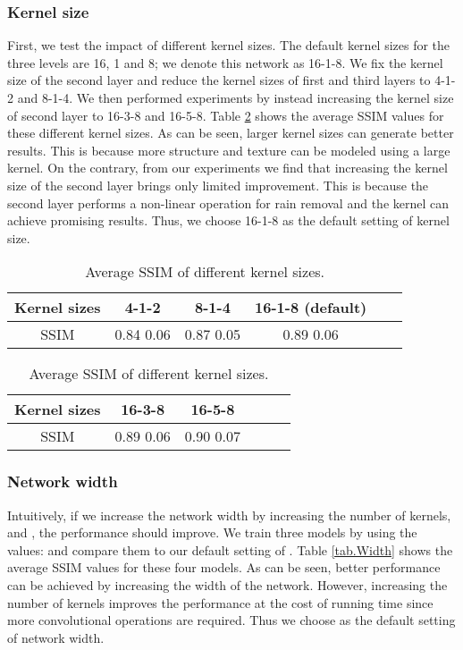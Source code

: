 \documentclass[journal]{IEEEtran}
\begin{document}
\subsubsection{Kernel size}
First, we test the impact of different kernel sizes. The default kernel sizes for the three levels are 16, 1 and 8; we denote this network as 16-1-8. We fix the kernel size of the second layer and reduce the kernel sizes of first and third layers to 4-1-2 and 8-1-4. We then performed experiments by instead increasing the kernel size of second layer to 16-3-8 and 16-5-8. Table \ref{tab.Kernel_size} shows the average SSIM values for these different kernel sizes. As can be seen, larger kernel sizes can generate better results. This is because more structure and texture can be modeled using a large kernel. On the contrary, from our experiments we find that increasing the kernel size of the second layer brings only limited improvement. This is because the second layer performs a non-linear operation for rain removal and the  kernel can achieve promising results. Thus, we choose 16-1-8 as the default setting of kernel size.

\begin{table}[!h]
\caption{Average SSIM of different kernel sizes.}
\label{tab.Kernel_size}
\centering
\begin{tabular}{|c|c|c|c|c|c|}
\hline
Kernel sizes &4-1-2 &8-1-4 & 16-1-8 (default) \\
\hline
SSIM&0.84  0.06 &  0.87  0.05  &0.89  0.06 \\
\hline
\end{tabular}
\begin{tabular}{|c|c|c|c|c|c|}
\hline
Kernel sizes &16-3-8 & 16-5-8   \\
\hline
SSIM&0.89  0.06 &  0.90  0.07    \\
\hline
\end{tabular}
\end{table}

\subsubsection{Network width}
Intuitively, if we increase the network width by increasing the number of kernels,  and , the performance should improve. We train three models by using the values:  and compare them to our default setting of . Table \ref{tab.Width}  shows the average SSIM values for these four models. As can be seen, better performance can be achieved by increasing the width of the network. However, increasing the number of kernels improves the performance at the cost of running time since more convolutional operations are required. Thus we choose  as the default setting of network width.
\end{document}
